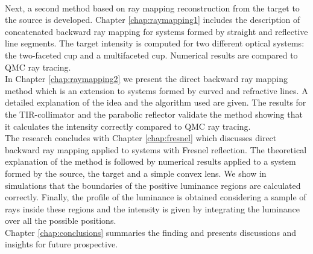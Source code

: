 \\ \indent Next, a second method based on ray mapping reconstruction from the target to the source is developed. Chapter \ref{chap:raymapping1} includes the description of concatenated backward ray mapping for systems formed by straight and reflective line segments. The target intensity is computed for two different optical systems: the two-faceted cup and a multifaceted cup. Numerical results are compared to QMC ray tracing. \\ \indent 
In Chapter \ref{chap:raymapping2} we present the direct backward ray mapping method which is an extension to systems formed by curved and refractive lines. A detailed explanation of the idea and the algorithm used are given. The results for the TIR-collimator and the parabolic reflector validate the method showing that it calculates the intensity correctly compared to QMC ray tracing. \\ \indent
The research concludes with Chapter \ref{chap:fresnel} which discusses direct backward ray mapping applied to systems with Fresnel reflection. The theoretical explanation of the method is followed by numerical results applied to a system formed by the source, the target and a simple convex lens. We show in simulations that the boundaries of the positive luminance regions are calculated correctly. Finally, the profile of the luminance is obtained considering a sample of rays inside these regions and the intensity is given by integrating the luminance over all the possible positions. \\ \indent Chapter \ref{chap:conclusions} summaries the finding and presents discussions and insights for future prospective.
\clearpage{\pagestyle{empty}\cleardoublepage}
 